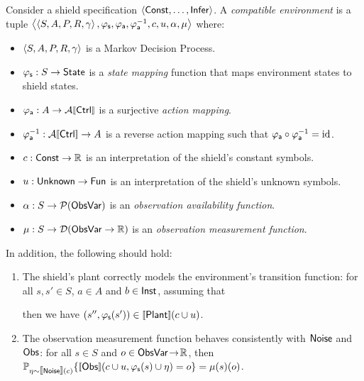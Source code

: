 \documentclass[acmsmall,screen,nonacm]{acmart}
\begin{document}
\begin{definition}\label{def:compat-env}
  Consider a shield specification $\left\langle\mathsf{Const}, \dots, \mathsf{Infer}\right\rangle$. A \emph{compatible environment} is a tuple $\left\langle\left\langle S, A, P, R, \gamma\right\rangle, \varphi_{\mathsf{s}}, \varphi_{\mathsf{a}}, \varphi_{\mathsf{a}}^{-1}, c, u, \alpha, \mu\right\rangle$ where:
  \begin{itemize}
    \item $\left\langle S, A, P, R, \gamma\right\rangle$ is a Markov Decision Process.
    \item $\varphi_{\mathsf{s}}: S \to \mathsf{State}$ is a \emph{state mapping} function that maps environment states to shield states.
    \item $\ActionMapping: A \to \CtrlActionSem{\Ctrl}$ is a surjective \emph{action mapping}.
    \item $\RevActionMapping : \CtrlActionSem{\Ctrl} \to A$ is a reverse action mapping such that $\varphi_{\mathsf{a}} \circ \varphi_{\mathsf{a}}^{-1} = \operatorname{\text{id}}$.
    \item $c : \mathsf{Const} \to \mathbb{R}$ is an interpretation of the shield's constant symbols.
    \item $u : \mathsf{Unknown} \to \mathsf{Fun}$ is an interpretation of the shield's unknown symbols.
    \item $\alpha : S \to \mathcal{P}(\mathsf{ObsVar})$ is an \emph{observation availability function}.
    \item $\mu : S \to \mathcal{D}(\mathsf{ObsVar} \to \mathbb{R})$ is an \emph{observation measurement function}.
  \end{itemize}
  In addition, the following should hold:
  \begin{enumerate}
    \item \label{item:correct-model} The shield's plant correctly models the environment's transition function: for all $s, s' \in S$, $a \in A$ and $b \in \mathsf{Inst}$, assuming that
     then we have $(s'', \StateMapping(s')) \in \sem{\Plant}(c \CatValuation u)$.
    \item \label{item:correct-observation} \label{} The observation measurement function behaves consistently with $\mathsf{Noise}$ and $\mathsf{Obs}$: for all $s \in S$ and $o \in \mathsf{ObsVar} \mathrel{\!\to\!} \mathbb{R}$, then $\Prob_{\eta \sim \sem{\Noise}(c)}\{ \sem{\Obs}(c \CatValuation u, \StateMapping(s) \CatValuation \eta) = o\} = \ObsMeasurementFun(s)(o)$.
  \end{enumerate}
\end{definition}
\end{document}
